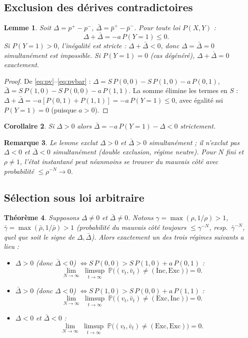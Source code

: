 \documentclass[12pt,a4paper]{article}
\newtheorem{theorem}{Théorème}
\newtheorem{lemma}[theorem]{Lemme}
\newtheorem{corollary}[theorem]{Corollaire}
\newtheorem{remark}[theorem]{Remarque}
\newcommand{\Inc}{\ensuremath{\mathrm{Inc}}}
\newcommand{\Exc}{\ensuremath{\mathrm{Exc}}}
\newcommand{\vbar}{\bar{v}}
\begin{document}
\subsection*{Exclusion des dérives contradictoires}

\begin{lemma}\label{lem:excl}
Soit $\Delta=p^+-p^-$, $\bar\Delta=\bar p^+-\bar p^-$. Pour toute loi $P(X,Y)$ :
\[
  \Delta+\bar\Delta = -a\,P(Y{=}1) \le 0.
\]
Si $P(Y{=}1)>0$, l'inégalité est \emph{stricte} : $\Delta+\bar\Delta<0$, donc
$\Delta=\bar\Delta=0$ simultanément est impossible. Si $P(Y{=}1)=0$ (cas
dégénéré), $\Delta+\bar\Delta=0$ exactement.
\end{lemma}

\begin{proof}
De \eqref{eq:pv}--\eqref{eq:pvbar} : $\Delta = S\,P(0,0)-S\,P(1,0)-a\,P(0,1)$,
$\bar\Delta = S\,P(1,0)-S\,P(0,0)-a\,P(1,1)$. La somme élimine les termes en
$S$ : $\Delta+\bar\Delta=-a[P(0,1)+P(1,1)]=-a\,P(Y{=}1)\le0$, avec égalité
ssi $P(Y{=}1)=0$ (puisque $a>0$).
\end{proof}

\begin{corollary}\label{cor:asym}
Si $\Delta>0$ alors $\bar\Delta=-a\,P(Y{=}1)-\Delta<0$ strictement.
\end{corollary}

\begin{remark}
Le lemme exclut $\Delta>0$ et $\bar\Delta>0$ simultanément ; il n'exclut pas
$\Delta<0$ et $\bar\Delta<0$ simultanément (double exclusion, régime neutre).
Pour $N$ fini et $\rho\ne1$, l'état instantané peut néanmoins se trouver du
mauvais côté avec probabilité $\le\rho^{-N}\to0$.
\end{remark}

\subsection*{Sélection sous loi arbitraire}

\begin{theorem}\label{thm:sel}
Supposons $\Delta\ne0$ et $\bar\Delta\ne0$. Notons $\gamma=\max(\rho,1/\rho)>1$,
$\bar\gamma=\max(\bar\rho,1/\bar\rho)>1$ (probabilité du mauvais côté toujours
$\le\gamma^{-N}$, resp.\ $\bar\gamma^{-N}$, quel que soit le signe de
$\Delta,\bar\Delta$). Alors exactement un des trois régimes suivants a lieu :
\begin{itemize}
  \item $\Delta>0$ (donc $\bar\Delta<0$) $\iff S\,P(0,0)>S\,P(1,0)+a\,P(0,1)$ :
  \[
    \lim_{N\to\infty}\;\limsup_{t\to\infty}\;\mathbb P\bigl((v_t,\vbar_t)\ne(\Inc,\Exc)\bigr) = 0.
  \]
  \item $\bar\Delta>0$ (donc $\Delta<0$) $\iff S\,P(1,0)>S\,P(0,0)+a\,P(1,1)$ :
  \[
    \lim_{N\to\infty}\;\limsup_{t\to\infty}\;\mathbb P\bigl((v_t,\vbar_t)\ne(\Exc,\Inc)\bigr) = 0.
  \]
  \item $\Delta<0$ et $\bar\Delta<0$ :
  \[
    \lim_{N\to\infty}\;\limsup_{t\to\infty}\;\mathbb P\bigl((v_t,\vbar_t)\ne(\Exc,\Exc)\bigr) = 0.
  \]
\end{itemize}

\end{theorem}
\end{document}
